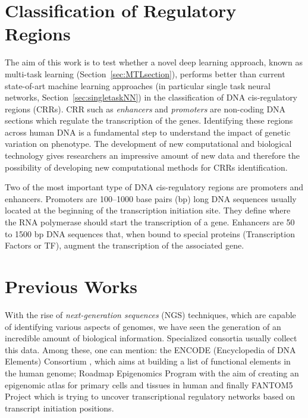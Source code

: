 \section{Classification of Regulatory Regions}
The aim of this work is to test whether a novel deep learning approach,
known as multi-task learning (Section~\ref{sec:MTLsection}), performs better than current state-of-art
machine learning approaches (in particular single task neural networks, Section~\ref{sec:singletaskNN}) in the classification of DNA cis-regulatory regions (CRRs). CRR such as
\emph{enhancers} and \emph{promoters} are non-coding DNA sections which
regulate the transcription of the genes. Identifying these regions across
human DNA is a fundamental step to understand the impact of genetic
variation on phenotype. The development of new computational and
biological technology gives researchers an impressive amount of new data and therefore the possibility of developing new computational methods
for CRRs identification.

Two of the most important type of DNA cis-regulatory regions are promoters
and enhancers. Promoters are 100–1000 base pairs (bp) long DNA sequences
usually located at the beginning of the transcription initiation site.
They define where the RNA polymerase should start the transcription of a
gene. Enhancers are 50 to 1500 bp DNA sequences that, when bound to
special proteins (Transcription Factors or TF), augment the transcription
of the associated gene.

\section{Previous Works}
With the rise of \emph{next-generation sequences} (NGS) techniques, which are
capable of identifying various aspects of genomes, we have seen the generation of an incredible amount of biological information. Specialized consortia usually collect this data. Among these, one can mention: the ENCODE
(Encyclopedia of DNA Elements) Consortium \cite{ENCODE_data}, which aims at building a list of functional elements in the human genome; Roadmap Epigenomics Program \cite{ROADMAP} with the aim of creating an epigenomic atlas for primary cells and tissues in human and finally FANTOM5 Project \cite{FANTOM_data} which is trying to uncover transcriptional regulatory networks based on transcript initiation positions.

